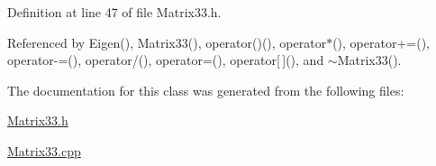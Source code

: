 Definition at line 47 of file Matrix33.h.



Referenced by Eigen(), Matrix33(), operator()(), operator$\ast$(), operator+=(), operator-\/=(), operator/(), operator=(), operator\mbox{[}$\,$\mbox{]}(), and $\sim$Matrix33().



The documentation for this class was generated from the following files:\begin{DoxyCompactItemize}
\item 
\hyperlink{Matrix33_8h}{Matrix33.h}\item 
\hyperlink{Matrix33_8cpp}{Matrix33.cpp}\end{DoxyCompactItemize}

